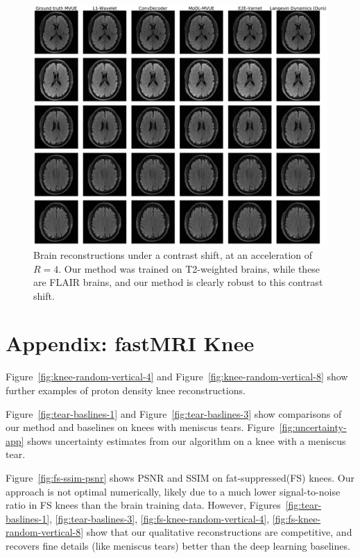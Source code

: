 \documentclass{article}
\newcounter{example}[section]
\begin{document}
\begin{figure}
    \centering
    \includegraphics[width=\columnwidth]{brains-flair-equispaced-vertical-4-flipped-mvue-comp.pdf}
    \caption{Brain reconstructions under a contrast shift, at an acceleration of $R=4$. Our method was trained on T2-weighted brains, while these are FLAIR brains, and our method is clearly robust to this contrast shift.}
    \label{fig:brain-flair-4}
\end{figure}
\clearpage

\section{Appendix: fastMRI Knee}\label{app:knees}
Figure~\ref{fig:knee-random-vertical-4} and Figure~\ref{fig:knee-random-vertical-8} show further examples of proton density knee reconstructions. 



Figure~\ref{fig:tear-baslines-1} and Figure~\ref{fig:tear-baslines-3} show comparisons of our method and baselines on knees with meniscus tears. Figure~\ref{fig:uncertainty-app} shows uncertainty estimates from our algorithm on a knee with a meniscus tear.

Figure~\ref{fig:fs-ssim-psnr} shows PSNR and SSIM on fat-suppressed(FS) knees. Our approach is not optimal numerically, likely due to a much lower signal-to-noise ratio in FS knees than the brain training data. However, Figures~\ref{fig:tear-baslines-1}, \ref{fig:tear-baslines-3}, \ref{fig:fs-knee-random-vertical-4}, \ref{fig:fs-knee-random-vertical-8} show that our qualitative reconstructions are competitive, and recovers fine details (like meniscus tears) better than the deep learning baselines.
\end{document}
